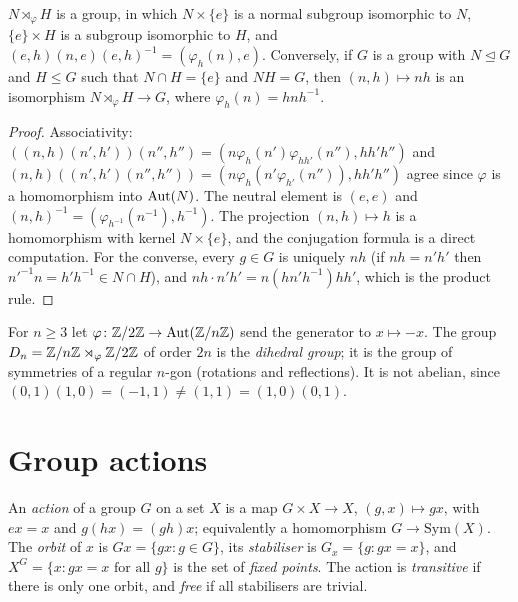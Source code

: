 \begin{proposition}\label{groups:proposition-semidirect}
$N \rtimes_\varphi H$ is a group, in which $N \times \{e\}$ is a normal subgroup
isomorphic to $N$, $\{e\} \times H$ is a subgroup isomorphic to $H$, and
$(e, h)(n, e)(e, h)^{-1} = (\varphi_h(n), e)$. Conversely, if $G$ is a group with
$N \trianglelefteq G$ and $H \leq G$ such that $N \cap H = \{e\}$ and $NH = G$, then
$(n, h) \mapsto nh$ is an isomorphism $N \rtimes_\varphi H \to G$, where
$\varphi_h(n) = hnh^{-1}$.
\end{proposition}

\begin{proof}
Associativity:
$((n,h)(n',h'))(n'',h'') = (n\varphi_h(n')\varphi_{hh'}(n''), hh'h'')$ and
$(n,h)((n',h')(n'',h'')) = (n\varphi_h(n'\varphi_{h'}(n'')), hh'h'')$ agree since
$\varphi$ is a homomorphism into $\operatorname{Aut}(N)$. The neutral element is $(e, e)$ and
$(n,h)^{-1} = (\varphi_{h^{-1}}(n^{-1}), h^{-1})$. The projection
$(n, h) \mapsto h$ is a homomorphism with kernel $N \times \{e\}$, and the conjugation
formula is a direct computation. For the converse, every $g \in G$ is uniquely
$nh$ (if $nh = n'h'$ then $n'^{-1}n = h'h^{-1} \in N \cap H$), and
$nh \cdot n'h' = n(hn'h^{-1})hh'$, which is the product rule.
\end{proof}

\begin{example}\label{groups:example-dihedral}
For $n \geq 3$ let $\varphi \colon \mathbb{Z}/2\mathbb{Z} \to \operatorname{Aut}(\mathbb{Z}/n\mathbb{Z})$ send the generator to
$x \mapsto -x$. The group $D_n = \mathbb{Z}/n\mathbb{Z} \rtimes_\varphi \mathbb{Z}/2\mathbb{Z}$ of order $2n$ is the
\emph{dihedral group}; it is the group of symmetries of a regular $n$-gon (rotations
and reflections). It is not abelian, since $(0,1)(1,0) = (-1, 1) \neq (1, 1) = (1,0)(0,1)$.
\end{example}

\section{Group actions}\label{groups:section-actions}

\begin{definition}\label{groups:definition-action}
An \emph{action} of a group $G$ on a set $X$ is a map $G \times X \to X$,
$(g, x) \mapsto gx$, with $ex = x$ and $g(hx) = (gh)x$; equivalently a homomorphism
$G \to \mathrm{Sym}(X)$. The \emph{orbit} of $x$ is $Gx = \{gx : g \in G\}$, its
\emph{stabiliser} is $G_x = \{g : gx = x\}$, and $X^G = \{x : gx = x \text{ for all } g\}$
is the set of \emph{fixed points}. The action is \emph{transitive} if there is
only one orbit, and \emph{free} if all stabilisers are trivial.
\end{definition}

